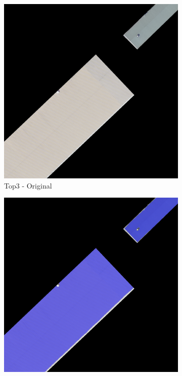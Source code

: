 \begin{figure}[H]
\begin{subfigure}{0.32\textwidth}
    \includegraphics[width=\textwidth]{02-main//figures/ch4/kfold_ensembles/segformer_tu-regnety_080.ra3_in1k/best_cases/best_3_iou0.987_24961121_tile_15_10_cc6553_original.png}
    \caption{Top3 - Original}
\end{subfigure}
\hfill
\begin{subfigure}{0.32\textwidth}
    \includegraphics[width=\textwidth]{02-main//figures/ch4/kfold_ensembles/segformer_tu-regnety_080.ra3_in1k/best_cases/best_3_iou0.987_24961121_tile_15_10_cc6553_overlay_gt.png}

\end{subfigure}
\end{figure}
